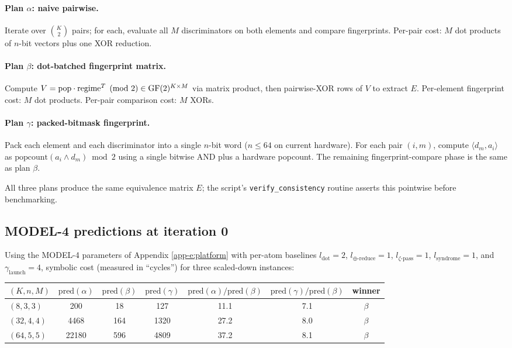 \paragraph{Plan $\alpha$: naive pairwise.}
Iterate over $\binom{K}{2}$ pairs; for each, evaluate
all $M$ discriminators on both elements and compare
fingerprints. Per-pair cost: $M$ dot products of
$n$-bit vectors plus one XOR reduction.

\paragraph{Plan $\beta$: dot-batched fingerprint matrix.}
Compute $V = \mathrm{pop} \cdot \mathrm{regime}^T
\pmod 2 \in \operatorname{GF}(2)^{K \times M}$ via matrix product,
then pairwise-XOR rows of $V$ to extract
$E$. Per-element fingerprint cost: $M$ dot products.
Per-pair comparison cost: $M$ XORs.

\paragraph{Plan $\gamma$: packed-bitmask fingerprint.}
Pack each element and each discriminator into a single
$n$-bit word ($n \leq 64$ on current hardware). For
each pair $(i, m)$, compute $\langle d_m, a_i \rangle$
as $\mathrm{popcount}(a_i \wedge d_m) \bmod 2$ using
a single bitwise AND plus a hardware popcount. The
remaining fingerprint-compare phase is the same as
plan $\beta$.

All three plans produce the same equivalence matrix
$E$; the script's \verb|verify_consistency| routine
asserts this pointwise before benchmarking.

\subsection{MODEL-4 predictions at iteration 0}
\label{app-f:predict}

Using the MODEL-4 parameters of
Appendix \ref{app-e:platform} with per-atom baselines
$l_{\mathrm{dot}} = 2$, $l_{\oplus\text{-reduce}} = 1$,
$l_{\zeta\text{-pass}} = 1$, $l_{\mathrm{syndrome}} = 1$,
and $\gamma_{\mathrm{launch}} = 4$, symbolic cost
(measured in ``cycles'') for three scaled-down
instances:

\begin{center}
\footnotesize
\begin{tabular}{l|ccc|ccc}
$(K, n, M)$ & $\mathrm{pred}(\alpha)$ & $\mathrm{pred}(\beta)$ & $\mathrm{pred}(\gamma)$
  & $\mathrm{pred}(\alpha)/\mathrm{pred}(\beta)$ & $\mathrm{pred}(\gamma)/\mathrm{pred}(\beta)$ & winner \\
\hline
$(8, 3, 3)$    & 200     & 18    & 127    & 11.1 & 7.1 & $\beta$ \\
$(32, 4, 4)$   & 4468    & 164   & 1320   & 27.2 & 8.0 & $\beta$ \\
$(64, 5, 5)$   & 22180   & 596   & 4809   & 37.2 & 8.1 & $\beta$ \\
\end{tabular}
\end{center}

